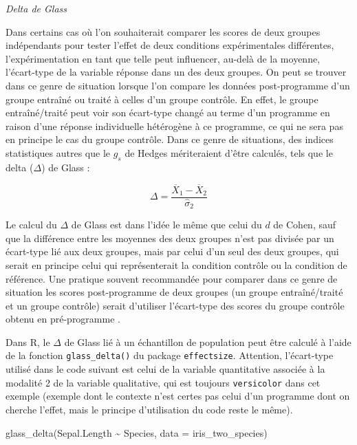 \documentclass[
]{book}
\newenvironment{Shaded}{\begin{snugshade}}{\end{snugshade}}
\newcommand{\AttributeTok}[1]{\textcolor[rgb]{0.77,0.63,0.00}{#1}}
\newcommand{\FunctionTok}[1]{\textcolor[rgb]{0.00,0.00,0.00}{#1}}
\newcommand{\NormalTok}[1]{#1}
\newcommand{\SpecialCharTok}[1]{\textcolor[rgb]{0.00,0.00,0.00}{#1}}
\begin{document}
\emph{Delta de Glass}

Dans certains cas où l'on souhaiterait comparer les scores de deux groupes indépendants pour tester l'effet de deux conditions expérimentales différentes, l'expérimentation en tant que telle peut influencer, au-delà de la moyenne, l'écart-type de la variable réponse dans un des deux groupes. On peut se trouver dans ce genre de situation lorsque l'on compare les données post-programme d'un groupe entraîné ou traité à celles d'un groupe contrôle. En effet, le groupe entraîné/traité peut voir son écart-type changé au terme d'un programme en raison d'une réponse individuelle hétérogène à ce programme, ce qui ne sera pas en principe le cas du groupe contrôle. Dans ce genre de situations, des indices statistiques autres que le \(g_{s}\) de Hedges mériteraient d'être calculés, tels que le delta (\(\Delta\)) de Glass \autocite{lakensCalculatingReportingEffect2013} :

\[\Delta = \frac{\overline{X}_{1} - \overline{X}_{2}} {\hat{\sigma}_{2}}\]

Le calcul du \(\Delta\) de Glass est dans l'idée le même que celui du \(d\) de Cohen, sauf que la différence entre les moyennes des deux groupes n'est pas divisée par un écart-type lié aux deux groupes, mais par celui d'un seul des deux groupes, qui serait en principe celui qui représenterait la condition contrôle ou la condition de référence. Une pratique souvent recommandée pour comparer dans ce genre de situation les scores post-programme de deux groupes (un groupe entraîné/traité et un groupe contrôle) serait d'utiliser l'écart-type des scores du groupe contrôle obtenu en pré-programme \autocite{lakensCalculatingReportingEffect2013}.

Dans R, le \(\Delta\) de Glass lié à un échantillon de population peut être calculé à l'aide de la fonction \texttt{glass\_delta()} du package \texttt{effectsize}. Attention, l'écart-type utilisé dans le code suivant est celui de la variable quantitative associée à la modalité 2 de la variable qualitative, qui est toujours \texttt{versicolor} dans cet exemple (exemple dont le contexte n'est certes pas celui d'un programme dont on cherche l'effet, mais le principe d'utilisation du code reste le même).

\begin{Shaded}
\begin{Highlighting}[]
\FunctionTok{glass\_delta}\NormalTok{(Sepal.Length }\SpecialCharTok{\textasciitilde{}}\NormalTok{ Species, }
            \AttributeTok{data =}\NormalTok{ iris\_two\_species)}
\end{Highlighting}
\end{Shaded}
\end{document}

